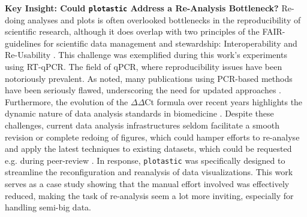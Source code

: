\textbf{Key Insight: Could \texttt{plotastic} Address a Re-Analysis Bottleneck?}
Re-doing analyses and plots is often overlooked bottlenecks in the
reproducibility of scientific research, although it does overlap with two
principles of the FAIR-guidelines for scientific data management and
stewardship: Interoperability and Re-Usability
\cite{wilkinsonFAIRGuidingPrinciples2016}. This challenge was exemplified during
this work's experiments using RT-qPCR. The field of qPCR, where reproducibility
issues have been notoriously prevalent. As
\citet{bustinReproducibilityBiomedicalResearch2014} noted, many publications
using PCR-based methods have been seriously flawed, underscoring the need for
updated approaches \cite{bustinNeedTransparencyGood2013,
    ruiz-villalbaUseMisuseCq2021}. Furthermore, the evolution of the
$\Delta\Delta$Ct formula over recent years highlights the dynamic nature of data
analysis standards in biomedicine \cite{pfafflNewMathematicalModel2001a,
    ramakersAssumptionfreeAnalysisQuantitative2003,
    ruijterEfficiencyCorrectionRequired2021}. Despite these challenges, current data
analysis infrastructures seldom facilitate a smooth revision or complete redoing
of figures, which could hamper efforts to re-analyse and apply the latest
techniques to existing datasets, which could be requested e.g. during
peer-review \cite{wilkinsonFAIRGuidingPrinciples2016}. In response,
\texttt{plotastic} was specifically designed to streamline the reconfiguration
and reanalysis of data visualizations. This work serves as a case study showing
that  the manual effort
involved was effectively reduced, making the task of re-analysis seem a lot more
inviting, especially for handling semi-big data.





